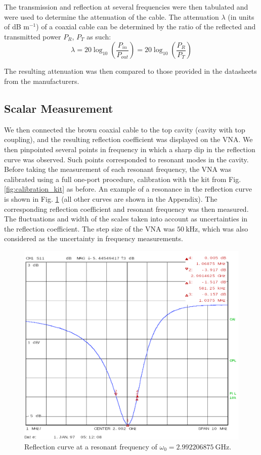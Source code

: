 \documentclass[a4paper]{report}
\numberwithin{equation}{section}
\begin{document}
The transmission and reflection at several frequencies were then tabulated and were used to determine the attenuation
of the cable. The attenuation $\lambda$ (in units of dB m$^{-1}$) of a coaxial cable can be determined by the ratio of the
reflected and transmitted power $P_R$, $P_T$ as such:
\begin{equation}
	\lambda = 20 \log_{10}\left(\frac{P_{in}}{P_{out}}\right) = 20 \log_{10}\left(\frac{P_R}{P_T}\right)
\end{equation} 

The resulting attenuation was then compared to those provided in the datasheets
from the manufacturers.\par 

\subsection{Scalar Measurement}

We then connected the brown coaxial cable to the top cavity (cavity with top
coupling), and the resulting reflection coefficient was displayed on the VNA.
We then pinpointed several points in frequency in which a sharp dip in the
reflection curve was observed. Such points corresponded to 
resonant modes in the cavity. Before taking the measurement of each resonant frequency, the VNA was calibrated
using a full one-port procedure, calibration with the kit from Fig.
\ref{fig:calibration_kit} as before. An example of a resonance in the
reflection curve is shown in Fig. \ref{fig:resonance_raw} (all other curves are shown in the Appendix). The corresponding
reflection coefficient and resonant frequency was then measured. The
fluctuations and width of the scales taken into account as uncertainties in the
reflection coefficient. The step size of the VNA was $\SI{50}{\kilo\hertz}$, which was also considered as the
uncertainty in frequency measurements.
\par 

\begin{figure}[htb!]
	\centering
	\includegraphics[width=0.6\columnwidth]{resonant1.1.png}
	\caption{Reflection curve at a resonant frequency of $\omega_0 =
	\SI{2.992206875}{\giga\hertz}$. }

	\label{fig:resonance_raw}
\end{figure}
\end{document}
